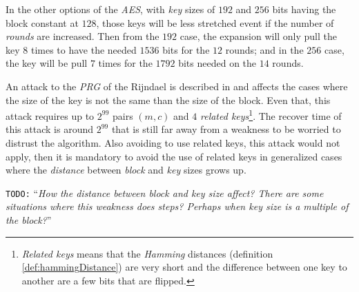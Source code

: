 \documentclass[10pt,a4paper,twoside]{llncs}
\newcommand{\todo}[1]{\texttt{\color{red}TODO:} ``\emph{#1}''}
\begin{document}
In the other options of the \emph{AES}, with \emph{key} sizes of $192$ and $256$ bits having the block constant at $128$, those keys will be less stretched event if the number of \emph{rounds} are increased. Then from the $192$ case, the expansion will only pull the key $8$ times to have the needed $1536$ bits for the $12$ rounds; and in the $256$ case, the key will be pull $7$ times for the $1792$ bits needed on the $14$ rounds.


An attack to the \emph{PRG} of the Rijndael is described in \cite{fullaes-192-256} and affects the cases where the size of the key is not the same than the size of the block. Even that, this attack requires up to $2^{99}$ pairs $(m,c)$ and $4$ \emph{related keys}\footnote{\emph{Related keys} means that the \emph{Hamming} distances (definition \ref{def:hammingDistance}) are very short and the difference between one key to another are a few bits that are flipped.}. The recover time of this attack is around $2^{99}$ that is still far away from a weakness to be worried to distrust the algorithm. Also avoiding to use related keys, this attack would not apply, then it is mandatory to avoid the use of related keys in generalized cases where the \emph{distance} between \emph{block} and \emph{key} sizes grows up.



\todo{How the distance between block and key size affect? There are some situations where this weakness does steps? Perhaps when key size is a multiple of the block?}
\end{document}
